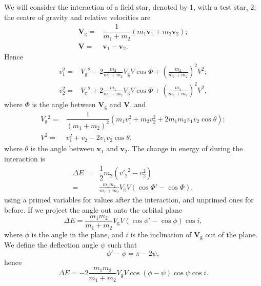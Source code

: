 \documentclass[useAMS,usedcolumn,usegraphicx,usenatbib]{mn2e}
\newcommand{\sub}[1]{\ensuremath{_\mathrm{#1}}}
\newcommand{\recip}[1]{\ensuremath{\dfrac{1}{#1}}}
\begin{document}
\begin{onecolumn}
We will consider the interaction of a field star, denoted by 1, with a test star, 2; the centre of gravity and relative velocities are
\begin{subequations}
\begin{align}
\boldsymbol{V}\sub{g} =  {} & \recip{m_1 + m_2}\left(m_1 \boldsymbol{v}_1 + m_2 \boldsymbol{v}_2\right);\\
\boldsymbol{V} =  {} & \boldsymbol{v}_1 - \boldsymbol{v}_2.
\end{align}
\label{eq:Vs}
\end{subequations}
Hence
\begin{subequations}
\begin{align}
v_1^2 = {} & V\sub{g}^2 - 2\frac{m_2}{m_1 + m_2}V\sub{g}V \cos\Phi + \left(\frac{m_2}{m_1 + m_2}\right)^2V^2;\\
v_2^2 = {} & V\sub{g}^2 + 2\frac{m_1}{m_1 + m_2}V\sub{g}V \cos\Phi + \left(\frac{m_1}{m_1 + m_2}\right)^2V^2,
\end{align}
\end{subequations}
where $\Phi$ is the angle between $\boldsymbol{V}\sub{g}$ and $\boldsymbol{V}$, and
\begin{subequations}
\begin{align}
V\sub{g}^2 = {} & \recip{(m_1 + m_2)^2}\left(m_1v_1^2 + m_2v_2^2 + 2 m_1 m_2 v_1 v_2 \cos\theta\right);\\
V^2 = {} & v_1^2 + v_2 - 2 v_1 v_2 \cos\theta,
\end{align}
\label{eq:V2s}
\end{subequations}
where $\theta$ is the angle between $\boldsymbol{v}_1$ and $\boldsymbol{v}_2$. The change in energy of during the interaction is
\begin{align}
\Delta E = {} & \recip{2} m_2 \left({v'_2}^2 - v_2^2\right)\\
 = {} & \frac{m_1 m_2}{m_1 + m_2}V\sub{g}V\left(\cos\Phi' - \cos\Phi\right),
\end{align}
using a primed variables for values after the interaction, and unprimed ones for before. If we project the angle out onto the orbital plane
\begin{equation}
\Delta E = \frac{m_1 m_2}{m_1 + m_2}V\sub{g}V\left(\cos\phi' - \cos\phi\right)\cos i,
\end{equation}
where $\phi$ is the angle in the plane, and $i$ is the inclination of $\boldsymbol{V}\sub{g}$ out of the plane. We define the deflection angle $\psi$ such that
\begin{equation}
\phi' - \phi = \pi - 2\psi,
\end{equation}
hence
\begin{equation}
\Delta E = -2\frac{m_1 m_2}{m_1 + m_2}V\sub{g}V\cos(\phi - \psi)\cos\psi\cos i.
\end{equation}


\end{onecolumn}
\end{document}
